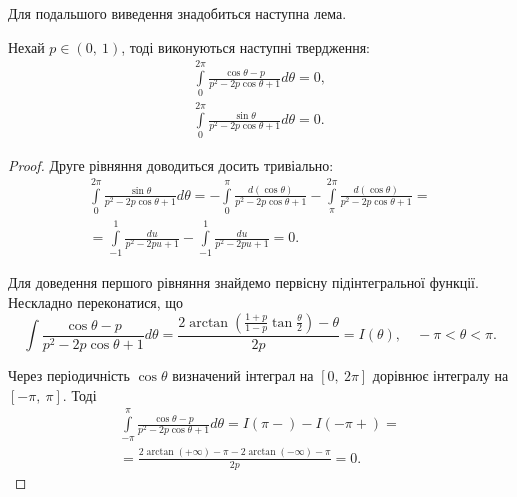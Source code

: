 Для подальшого виведення знадобиться наступна лема.
\begin{lem}
Нехай $p \in (0,~1)$, тоді виконуються наступні твердження:
\begin{gather}
	\int\limits_{0}^{2\pi} \frac{\cos \theta - p}{p^2 - 2p\cos\theta + 1} d \theta = 0 \label{eq:cosine_zero}, \\
	\int\limits_{0}^{2\pi} \frac{\sin \theta}{p^2 - 2p\cos\theta + 1} d \theta = 0 \label{eq:sine_zero}.
\end{gather}
\begin{proof}
	Друге рівняння доводиться досить тривіально:
	\begin{gather*}
	\int\limits_{0}^{2\pi} \frac{\sin \theta}{p^2 - 2p\cos\theta + 1} d\theta = -\int\limits_{0}^{\pi} \frac{d(\cos \theta)}{p^2 - 2p\cos\theta + 1} - \int\limits_{\pi}^{2\pi} \frac{d(\cos \theta)}{p^2 - 2p\cos\theta + 1} = \\
	=\int\limits_{-1}^{1} \frac{du}{p^2 - 2pu + 1} - \int\limits_{-1}^{1} \frac{du}{p^2 - 2pu + 1} = 0.
	\end{gather*}
	
	Для доведення першого рівняння знайдемо первісну підінтегральної функції. Нескладно переконатися, що
	\begin{equation*}
		\int \frac{\cos \theta - p}{p^2 - 2p\cos\theta + 1} d \theta = \frac{2\arctan\left(\frac{1 + p}{1-p} \tan \frac{\theta}{2} \right) - \theta}{2p} = I(\theta), \quad -\pi < \theta < \pi.
	\end{equation*}
	
	Через періодичність $\cos\theta$ визначений інтеграл на $[0,~2\pi]$ дорівнює інтегралу на $[-\pi,~\pi]$. Тоді
	\begin{gather*}
		\int\limits_{-\pi}^{\pi} \frac{\cos \theta - p}{p^2 - 2p\cos\theta + 1} d \theta = I(\pi-) - I(-\pi+) = \\
		=\frac{2\arctan(+\infty) - \pi - 2\arctan(-\infty) - \pi}{2p} = 0.
	\end{gather*} 
\end{proof}
\end{lem}

